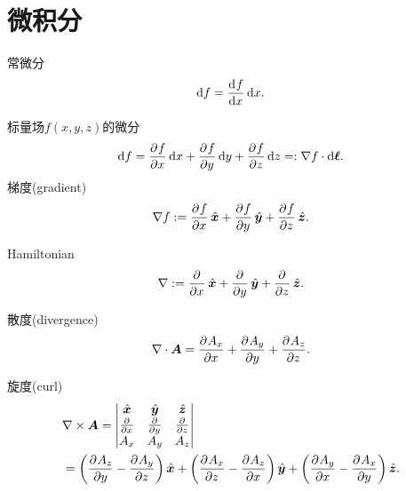 \section{微积分}
\begin{compactitem}
	\item 常微分
    \[
        \d f=\dv fx\d x.
    \]
	\item 标量场$f(x,y,z)$的微分
    \begin{align}
        \d f=\pv fx\d x+\pv fy\d y+\pv fz\d z=:\nabla f\cdot\d\bm\ell.
    \end{align}
    梯度(gradient)
    \begin{align}
        \nabla f:=\pv fx\uvec x+\pv fy\uvec y+\pv fz\uvec z.
    \end{align}
	\item Hamiltonian
	\begin{align}
        \nabla:=\pp x\uvec x+\pp y\uvec y+\pp z\uvec z.
    \end{align}
    \item 散度(divergence)
    \begin{align}
        \div\bm A=\pv{A_x}x+\pv{A_y}y+\pv{A_z}z.
    \end{align}
    \item 旋度(curl)
    \begin{align}\notag
        &\curl\bm A=\begin{vmatrix}
            \uvec x&\uvec y&\uvec z\\
            \pp x&\pp y&\pp z\\
            A_x&A_y&A_z
        \end{vmatrix}\\
        &=\biggkh{\pv{A_z}y-\pv{A_y}z}\uvec x+\biggkh{\pv{A_x}z-\pv{A_z}x}\uvec y+\biggkh{\pv{A_y}x-\pv{A_x}y}\uvec z.
    \end{align}
\end{compactitem}
